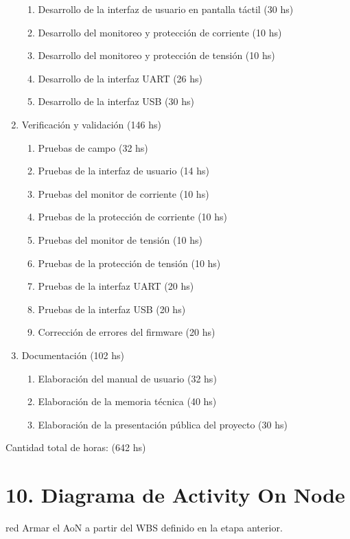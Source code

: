 \documentclass[
11pt, %
codirector, %
]{charter}
\begin{document}
\begin{enumerate}
\begin{enumerate}
	\item Desarrollo de la interfaz de usuario en pantalla táctil (30 hs)
	\item Desarrollo del monitoreo y protección de corriente (10 hs)
	\item Desarrollo del monitoreo y protección de tensión (10 hs)
	\item Desarrollo de la interfaz UART (26 hs)
	\item Desarrollo de la interfaz USB (30 hs)
	\end{enumerate}
\item Verificación y validación (146 hs)
	\begin{enumerate}
	\item Pruebas de campo (32 hs)
	\item Pruebas de la interfaz de usuario (14 hs)
	\item Pruebas del monitor de corriente (10 hs)
	\item Pruebas de la protección de corriente (10 hs)
	\item Pruebas del monitor de tensión (10 hs)
	\item Pruebas de la protección de tensión (10 hs)
	\item Pruebas de la interfaz UART (20 hs)
	\item Pruebas de la interfaz USB (20 hs)
	\item Corrección de errores del firmware (20 hs)
	\end{enumerate}
\item Documentación (102 hs)
	\begin{enumerate}
	\item Elaboración del manual de usuario (32 hs)
	\item Elaboración de la memoria técnica (40 hs)
	\item Elaboración de la presentación pública del proyecto (30 hs)
	\end{enumerate}
\end{enumerate}

Cantidad total de horas: (642 hs)

\section{10. Diagrama de Activity On Node}
\label{sec:AoN}

\begin{consigna}{red}
Armar el AoN a partir del WBS definido en la etapa anterior. 



\end{consigna}
\end{document}
